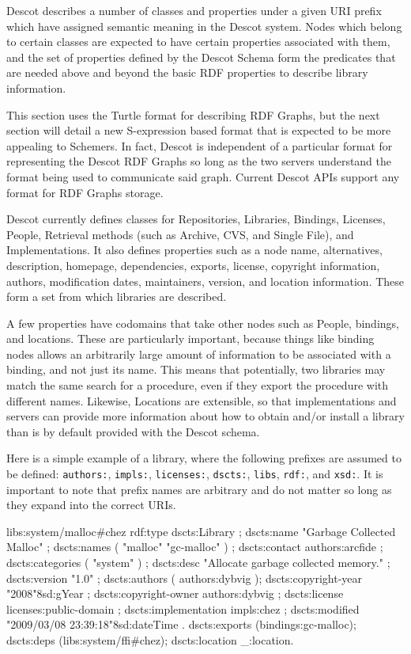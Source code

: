 Descot describes a number of classes and properties under a given 
URI prefix which have assigned semantic meaning in the Descot 
system. Nodes which belong to certain classes are expected to 
have certain properties associated with them, and the 
set of properties defined by the Descot Schema \cite{descotschema} 
form the predicates 
that are needed above and beyond the basic RDF properties \cite{rdfschema}
to describe library information. 

This section uses the Turtle format \cite{turtle} for describing RDF Graphs, 
but the next section will detail a new S-expression based format 
that is expected to be more appealing to Schemers. In fact, Descot 
is independent of a particular format for representing the 
Descot RDF Graphs so long as the two servers understand the format 
being used to communicate said graph. Current Descot APIs support 
any format for RDF Graphs storage.

Descot currently defines classes for Repositories, Libraries, 
Bindings, Licenses, People, Retrieval methods (such as 
Archive, CVS, and Single File), and Implementations. It also 
defines properties such as a node name, alternatives, 
description, homepage, dependencies, exports, license, 
copyright information, authors, modification dates, maintainers, 
version, and location information. These form a set from which 
libraries are described. 

A few properties have codomains that take other nodes such as People, 
bindings, and locations.  These are particularly important, because
things like binding nodes allows an arbitrarily large amount of 
information to be associated with a binding, and not just its 
name.  This means that potentially, two libraries may match the 
same search for a procedure, even if they export the procedure 
with different names. Likewise, Locations are extensible, so 
that implementations and servers can provide more information 
about how to obtain and/or install a library than is by default 
provided with the Descot schema. 

Here is a simple example of a library, where the 
following prefixes are assumed to be defined: {\tt authors:}, 
{\tt impls:}, {\tt licenses:}, {\tt dscts:}, 
{\tt libs},
{\tt rdf:}, and {\tt xsd:}. It is important to note that 
prefix names are arbitrary and do not matter so long as they 
expand into the correct URIs. 

\medskip
\verbatim
libs:system/malloc#chez
rdf:type dscts:Library ;
dscts:name "Garbage Collected Malloc" ;
dscts:names ( "malloc" "gc-malloc" ) ;
dscts:contact authors:arcfide ;
dscts:categories ( "system" ) ;
dscts:desc 
  "Allocate garbage collected memory." ;
dscts:version "1.0" ;
dscts:authors ( authors:dybvig );
dscts:copyright-year "2008"^^xsd:gYear ;
dscts:copyright-owner authors:dybvig ;
dscts:license licenses:public-domain ;
dscts:implementation impls:chez ;
dscts:modified 
  "2009/03/08 23:39:18"^^xsd:dateTime .
dscts:exports (bindings:gc-malloc);
dscts:deps (libs:system/ffi#chez);
dscts:location _:location.


